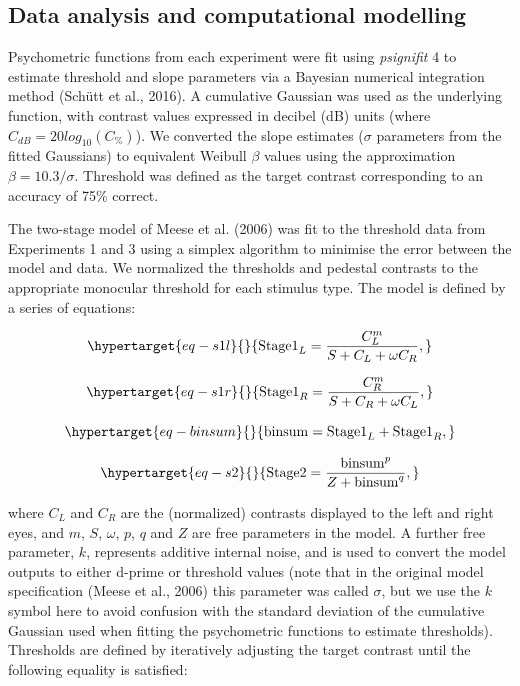 \documentclass[
  letterpaper,
  DIV=11,
  numbers=noendperiod]{scrartcl}
\begin{document}
\hypertarget{data-analysis-and-computational-modelling}{%
\subsection{Data analysis and computational
modelling}\label{data-analysis-and-computational-modelling}}

Psychometric functions from each experiment were fit using
\emph{psignifit} 4 to estimate threshold and slope parameters via a
Bayesian numerical integration method (Schütt et al., 2016). A
cumulative Gaussian was used as the underlying function, with contrast
values expressed in decibel (dB) units (where
\(C_{dB} = 20log_{10}(C_\%)\)). We converted the slope estimates
(\(\sigma\) parameters from the fitted Gaussians) to equivalent Weibull
\(\beta\) values using the approximation \(\beta = 10.3/\sigma\).
Threshold was defined as the target contrast corresponding to an
accuracy of 75\% correct.

The two-stage model of Meese et al. (2006) was fit to the threshold data
from Experiments 1 and 3 using a simplex algorithm to minimise the error
between the model and data. We normalized the thresholds and pedestal
contrasts to the appropriate monocular threshold for each stimulus type.
The model is defined by a series of equations:

\begin{equation}\protect\hypertarget{eq-s1l}{}{\mathrm{Stage1}_L = \frac{C_L^m}{S + C_L + \omega C_R},}\label{eq-s1l}\end{equation}

\begin{equation}\protect\hypertarget{eq-s1r}{}{\mathrm{Stage1}_R = \frac{C_R^m}{S + C_R + \omega C_L},}\label{eq-s1r}\end{equation}

\begin{equation}\protect\hypertarget{eq-binsum}{}{\mathrm{binsum} = \mathrm{Stage1}_L + \mathrm{Stage1}_R,}\label{eq-binsum}\end{equation}

\begin{equation}\protect\hypertarget{eq-s2}{}{\mathrm{Stage2} = \frac{\mathrm{binsum}^p}{Z + \mathrm{binsum}^q},}\label{eq-s2}\end{equation}

where \(C_L\) and \(C_R\) are the (normalized) contrasts displayed to
the left and right eyes, and \(m\), \(S\), \(\omega\), \(p\), \(q\) and
\(Z\) are free parameters in the model. A further free parameter, \(k\),
represents additive internal noise, and is used to convert the model
outputs to either d-prime or threshold values (note that in the original
model specification (Meese et al., 2006) this parameter was called
\(\sigma\), but we use the \(k\) symbol here to avoid confusion with the
standard deviation of the cumulative Gaussian used when fitting the
psychometric functions to estimate thresholds). Thresholds are defined
by iteratively adjusting the target contrast until the following
equality is satisfied:
\end{document}

